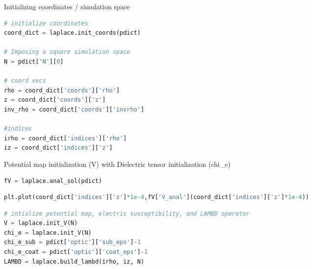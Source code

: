 \noindent Initializing coordinates / simulation space

\begin{spacing}{1.2} \begin{lstlisting}[frame=single, language=Python]
# initialize coordinates
coord_dict = laplace.init_coords(pdict) 

# Imposing a square simulation space
N = pdict['N'][0]

# coord vecs
rho = coord_dict['coords']['rho']
z = coord_dict['coords']['z']
inv_rho = coord_dict['coords']['invrho']

#indices 
irho = coord_dict['indices']['rho']
iz = coord_dict['indices']['z']
\end{lstlisting} \end{spacing}

\noindent Potential map initialization (V) with Dielectric tensor initialization (chi\_e)

\begin{spacing}{1.2} \begin{lstlisting}[frame=single, language=Python]
fV = laplace.anal_sol(pdict)
\end{lstlisting} \end{spacing}

\begin{spacing}{1.2} \begin{lstlisting}[frame=single, language=Python]
plt.plot(coord_dict['indices']['z']*1e-4,fV['V_anal'](coord_dict['indices']['z']*1e-4))
\end{lstlisting} \end{spacing}

\begin{spacing}{1.2} \begin{lstlisting}[frame=single, language=Python]
# intialize potential map, electric susceptibility, and LAMBD operator
V = laplace.init_V(N)
chi_e = laplace.init_V(N)
chi_e_sub = pdict['optic']['sub_eps']-1
chi_e_coat = pdict['optic']['coat_eps']-1
LAMBD = laplace.build_lambd(irho, iz, N)
\end{lstlisting} \end{spacing}

